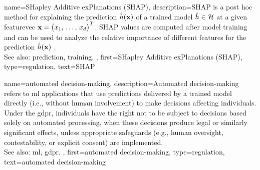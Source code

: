 {name={SHapley Additive exPlanations (SHAP)},
	description={SHAP is a post hoc method for 
		explaining the \gls{prediction} $\hat{h}({\bf x})$ 
		of a trained \gls{model} $\hat{h} \in \mathcal{H}$ 
		at a given \gls{featurevec} ${\bf x}=\big( x_1,\,\dots,\,x_d\big)^{T}$.  
		SHAP values are computed after \gls{model} \gls{training} and can 
		be used to analyze the relative importance of different \glspl{feature} 
		for the \gls{prediction} $\hat{h}({\bf x})$ \cite{Molnar2019}.
		\\
		See also: \gls{prediction}, \gls{training}. },
	first={SHapley Additive exPlanations (SHAP)},
	type=regulation, 
	text={SHAP}
}

{name={automated decision-making},
	description={Automated decision-making 
		refers to \gls{ml} applications that use \glspl{prediction} 
		delivered by a trained \gls{model} directly (i.e., without human involvement) 
		to make decisions affecting individuals. Under the \gls{gdpr}, 
		individuals have the right not to be subject to decisions based 
		solely on automated processing, when these decisions produce 
		legal or similarly significant effects, unless appropriate 
		safeguards (e.g., human oversight, contestability, or explicit consent) 
		are implemented.
		\\
		See also: \gls{ml}, \gls{gdpr}. }, 
	first={automated decision-making},
	type=regulation,
	text={automated decision-making}
}




